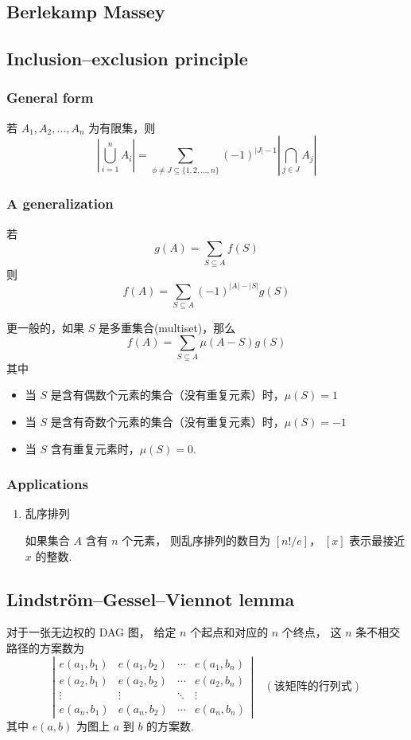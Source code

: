 \subsection{Berlekamp Massey}


\subsection{Inclusion–exclusion principle}
\subsubsection{General form}
若 $A_1, A_2, \dots, A_n$ 为有限集，则
$$
\left|\bigcup_{i=1}^n{A_i}\right|
=
\sum_{\phi \ne J \subseteq \{1,2,\dots,n\}}{(-1)^{ |J| - 1 }\left|\bigcap_{j \in J}{A_j}\right| }
$$
\subsubsection{A generalization}

若
$$ g(A) = \sum_{S \subseteq A}{f(S)} $$
则
$$ f(A) = \sum_{S \subseteq A}{(-1)^{ |A| - |S| }g(S)} $$

更一般的，如果 $S$ 是多重集合(multiset)，那么
$$ f(A) = \sum_{S \subseteq A}{\mu(A - S)g(S)}$$
其中
\begin{itemize}
\item 当 $S$ 是含有偶数个元素的集合（没有重复元素）时，$\mu(S) = 1$
\item 当 $S$ 是含有奇数个元素的集合（没有重复元素）时，$\mu(S) = -1$
\item 当 $S$ 含有重复元素时，$\mu(S) = 0$.
\end{itemize}
\subsubsection{Applications}
\begin{enumerate}
\item 乱序排列

    如果集合 $A$ 含有 $n$ 个元素，
    则乱序排列的数目为 $[n! / e]$， $[x]$ 表示最接近 $x$ 的整数.
\end{enumerate}

\subsection{Lindström–Gessel–Viennot lemma}
对于一张无边权的 DAG 图，
给定 $n$ 个起点和对应的 $n$ 个终点，
这 $n$ 条不相交路径的方案数为
\[
\left|
\begin{array}{cccc}
e(a_1, b_1) & e(a_1, b_2) & \cdots & e(a_1, b_n) \\
e(a_2, b_1) & e(a_2, b_2) & \cdots & e(a_2, b_n) \\
\vdots & \vdots & \ddots & \vdots \\
e(a_n, b_1) & e(a_n, b_2) & \cdots & e(a_n, b_n)
\end{array}
\right|
\quad (\text{该矩阵的行列式})
\]
其中 $e(a,b)$ 为图上 $a$ 到 $b$ 的方案数.
